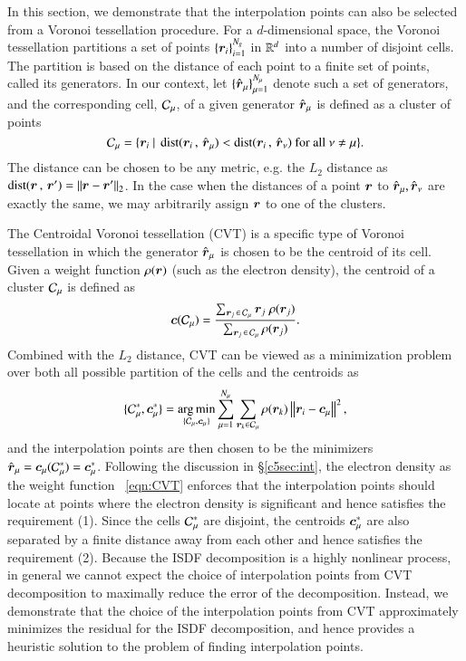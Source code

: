 In this section, we demonstrate that the interpolation points can also be
selected from a Voronoi tessellation procedure. For a $d$-dimensional space, the
Voronoi tessellation partitions a set of points $\{\bm{r}_{i}\}_{i=1}^{N_{g}}$ in
$\mathbb{R}^{d}$ into a number of disjoint cells. The partition is based on the
distance of each point to a finite set of points, called its generators. In our
context, let $\{\smash{\hat{\bm{r}}}_\mu\}_{\mu=1}^{N_{\mu}}$ denote such a set of generators,
and the corresponding cell, $\mathcal{C}_\mu$, of a given generator $\smash{\hat{\bm{r}}}_\mu$ is
defined as a cluster of points
\begin{equation}\label{eqn:vcell}
  \mathcal{C}_\mu = \{\bm{r}_{i} ~\vert~\operatorname{dist}(\bm{r}_{i}\,,\, \smash{\hat{\bm{r}}}_\mu) <
  \operatorname{dist}(\bm{r}_{i}\, ,\, \smash{\hat{\bm{r}}}_\nu) \textrm{ for all } \nu \neq \mu\}.
\end{equation}
The distance can be chosen to be any metric, e.g. the $L_2$ distance as $\operatorname{dist}
(\bm{r}\,,\,\bm{r}')=\left\lVert\bm{r}-\bm{r}'\right\rVert_2$. In the case when the distances of a point
$\bm{r}$ to $\smash{\hat{\bm{r}}}_\mu, \smash{\hat{\bm{r}}}_\nu$ are exactly the same, we may arbitrarily
assign $\bm{r}$ to one of the clusters.

The Centroidal Voronoi tessellation (CVT) is a specific type of Voronoi
tessellation in which the generator $\smash{\hat{\bm{r}}}_\mu$ is chosen to be the centroid of
its cell. Given a weight function $\rho(\bm{r})$ (such as the electron density),
the centroid of a cluster $\mathcal{C}_\mu$ is defined as
\begin{equation}\label{eqn:centcomp}
  \bm{c}(\mathcal{C}_\mu) = \frac{\sum_{\bm{r}_{j}\operatorname{\in} \mathcal{C}_\mu} \bm{r}_j\;\rho
  (\bm{r}_j)}{\sum_{\bm{r}_j\operatorname{\in} \mathcal{C}_\mu}\rho(\bm{r}_j)}.
\end{equation}
Combined with the $L_2$ distance, CVT can be viewed as a minimization problem
over both all possible partition of the cells and the centroids as \cite{MacQueen1967}
\begin{equation}\label{eqn:CVT}
  \{\mathcal{C}_\mu^\ast,\bm{c}_{\mu}^{*}\} = \operatorname*{arg\,min}_{\{\mathcal{C}_\mu, \bm{c}_{\mu}\}} \sum_
  {\mu=1}^{N_{\mu}} \sum_{\bm{r}_k\in \mathcal{C}_\mu}\rho(\bm{r}_k)\left\lVert\bm{r}_i-\bm{c}_{\mu}\right\rVert^2,
\end{equation}
and the interpolation points are then chosen to be the minimizers
$\smash{\hat{\bm{r}}}_\mu=\bm{c}_{\mu}(\mathcal{C}_\mu^\ast)=\bm{c}_{\mu}^{\ast}$. Following the
discussion in \S \ref{c5sec:int}, the electron density as the weight function~
\eqref{eqn:CVT} enforces that the interpolation points should locate at points
where the electron density is significant and hence satisfies the requirement 
(1). Since the cells $\mathcal{C}_\mu^\ast$ are disjoint, the centroids $\bm{c}_{\mu}^
\ast$ are also separated by a finite distance away from each other and hence
satisfies the requirement (2). Because the ISDF decomposition is a highly
nonlinear process, in general we cannot expect the choice of interpolation
points from CVT decomposition to maximally reduce the error of the
decomposition. Instead, we demonstrate that the choice of the interpolation
points from CVT approximately minimizes the residual for the ISDF decomposition,
and hence provides a heuristic solution to the problem of finding interpolation
points.

